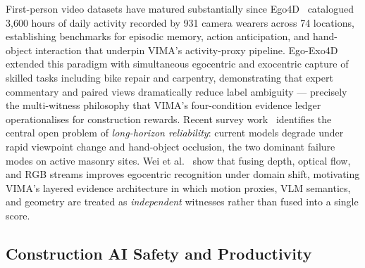 \documentclass[sigconf,nonacm]{acmart}
\begin{document}
First-person video datasets have matured substantially since
Ego4D~\cite{grauman2022ego4d} catalogued 3,600 hours of daily activity recorded
by 931 camera wearers across 74 locations, establishing benchmarks for episodic
memory, action anticipation, and hand-object interaction that underpin VIMA's
activity-proxy pipeline.
Ego-Exo4D~\cite{grauman2024egoexo4d} extended this paradigm with simultaneous
egocentric and exocentric capture of skilled tasks including bike repair and
carpentry, demonstrating that expert commentary and paired views dramatically
reduce label ambiguity --- precisely the multi-witness philosophy that VIMA's
four-condition evidence ledger operationalises for construction rewards.
Recent survey work~\cite{plizzari2024outlook} identifies the central open
problem of \emph{long-horizon reliability}: current models degrade under rapid
viewpoint change and hand-object occlusion, the two dominant failure modes on
active masonry sites.
Wei et al.~\cite{wei2024multimodal} show that fusing depth, optical flow, and
RGB streams improves egocentric recognition under domain shift, motivating
VIMA's layered evidence architecture in which motion proxies, VLM semantics,
and geometry are treated as \emph{independent} witnesses rather than fused into
a single score.

\subsection{Construction AI Safety and Productivity}
\label{sec:relwork-construction}
\end{document}
